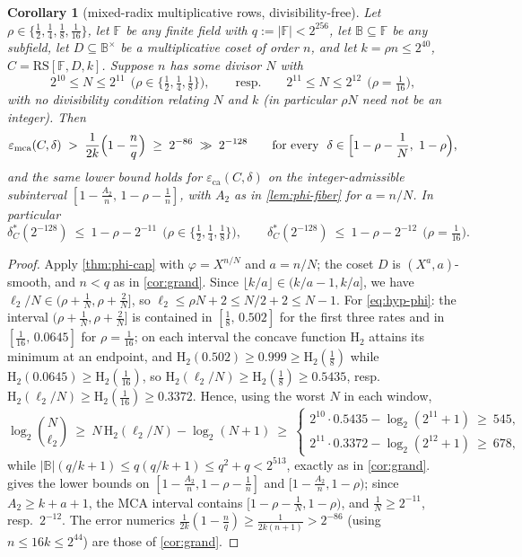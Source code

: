 \documentclass[11pt]{article}
\newtheorem{corollary}[corollary]{Corollary}
\theoremstyle{definition}
\theoremstyle{remark}
\newcommand{\F}{\mathbb{F}}
\newcommand{\B}{\mathbb{B}}
\newcommand{\RS}{\mathrm{RS}}
\newcommand{\eca}{\varepsilon_{\mathrm{ca}}}
\newcommand{\emca}{\varepsilon_{\mathrm{mca}}}
\newcommand{\Hb}{\mathrm{H}_2}
\begin{document}
\begin{corollary}[mixed-radix multiplicative rows, divisibility-free]\label{cor:mixed-radix}
Let $\rho\in\{\frac12,\frac14,\frac18,\frac1{16}\}$, let $\F$ be any finite field with $q:=|\F|<2^{256}$, let $\B\subseteq\F$ be any subfield, let $D\subseteq\B^\times$ be a multiplicative coset of order $n$, and let $k=\rho n\le2^{40}$, $C=\RS[\F,D,k]$. Suppose $n$ has \emph{some} divisor $N$ with
\[
2^{10}\le N\le2^{11}\ \ \bigl(\rho\in\{\tfrac12,\tfrac14,\tfrac18\}\bigr),
\qquad\text{resp.}\qquad
2^{11}\le N\le2^{12}\ \ \bigl(\rho=\tfrac1{16}\bigr),
\]
with no divisibility condition relating $N$ and $k$ \textup(in particular $\rho N$ need not be an integer\textup). Then
\[
\emca(C,\delta)\;>\;\frac1{2k}\Bigl(1-\frac nq\Bigr)\;\ge\;2^{-86}\;\gg\;2^{-128}
\qquad\text{for every }\ \delta\in\Bigl[1-\rho-\frac1N,\ 1-\rho\Bigr),
\]
and the same lower bound holds for $\eca(C,\delta)$ on the integer-admissible subinterval $[1-\frac{A_2}n,\,1-\rho-\frac1n]$, with $A_2$ as in \cref{lem:phi-fiber} for $a=n/N$. In particular
\[
\delta^*_C(2^{-128})\ \le\ 1-\rho-2^{-11}\ \ \bigl(\rho\in\{\tfrac12,\tfrac14,\tfrac18\}\bigr),
\qquad
\delta^*_C(2^{-128})\ \le\ 1-\rho-2^{-12}\ \ \bigl(\rho=\tfrac1{16}\bigr).
\]
\end{corollary}

\begin{proof}
Apply \cref{thm:phi-cap} with $\varphi=X^{n/N}$ and $a=n/N$; the coset $D$ is $(X^a,a)$-smooth, and $n<q$ as in \cref{cor:grand}. Since $\lfloor k/a\rfloor\in(k/a-1,k/a]$, we have $\ell_2/N\in(\rho+\frac1N,\rho+\frac2N]$, so $\ell_2\le\rho N+2\le N/2+2\le N-1$. For \eqref{eq:hyp-phi}: the interval $(\rho+\frac1N,\rho+\frac2N]$ is contained in $[\frac18,\,0.502]$ for the first three rates and in $[\frac1{16},\,0.0645]$ for $\rho=\frac1{16}$; on each interval the concave function $\Hb$ attains its minimum at an endpoint, and $\Hb(0.502)\ge0.999\ge\Hb(\frac18)$ while $\Hb(0.0645)\ge\Hb(\frac1{16})$, so $\Hb(\ell_2/N)\ge\Hb(\frac18)\ge0.5435$, resp.\ $\Hb(\ell_2/N)\ge\Hb(\frac1{16})\ge0.3372$. Hence, using the worst $N$ in each window,
\[
\log_2\binom N{\ell_2}\ \ge\ N\,\Hb(\ell_2/N)-\log_2(N+1)\ \ge\
\begin{cases}
2^{10}\cdot0.5435-\log_2(2^{11}+1)\ \ge\ 545,\\[2pt]
2^{11}\cdot0.3372-\log_2(2^{12}+1)\ \ge\ 678,
\end{cases}
\]
while $|\B|(q/k+1)\le q(q/k+1)\le q^2+q<2^{513}$, exactly as in \cref{cor:grand}.  gives the lower bounds on $[1-\frac{A_2}n,1-\rho-\frac1n]$ and $[1-\frac{A_2}n,1-\rho)$; since $A_2\ge k+a+1$, the MCA interval contains $[1-\rho-\frac1N,1-\rho)$, and $\frac1N\ge2^{-11}$, resp.\ $2^{-12}$. The error numerics $\frac1{2k}(1-\frac nq)\ge\frac1{2k(n+1)}>2^{-86}$ (using $n\le16k\le2^{44}$) are those of \cref{cor:grand}.
\end{proof}
\end{document}
